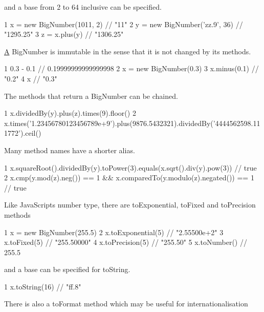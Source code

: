 and a base from 2 to 64 inclusive can be specified.


\begin{DoxyCode}
1 x = new BigNumber(1011, 2)          // "11"
2 y = new BigNumber('zz.9', 36)       // "1295.25"
3 z = x.plus(y)                       // "1306.25"
\end{DoxyCode}


\hyperlink{class_a}{A} Big\+Number is immutable in the sense that it is not changed by its methods.


\begin{DoxyCode}
1 0.3 - 0.1                           // 0.19999999999999998  
2 x = new BigNumber(0.3)
3 x.minus(0.1)                        // "0.2"
4 x                                   // "0.3"
\end{DoxyCode}


The methods that return a Big\+Number can be chained.


\begin{DoxyCode}
1 x.dividedBy(y).plus(z).times(9).floor()
2 x.times('1.23456780123456789e+9').plus(9876.5432321).dividedBy('4444562598.111772').ceil()
\end{DoxyCode}


Many method names have a shorter alias.


\begin{DoxyCode}
1 x.squareRoot().dividedBy(y).toPower(3).equals(x.sqrt().div(y).pow(3))         // true
2 x.cmp(y.mod(z).neg()) == 1 && x.comparedTo(y.modulo(z).negated()) == 1        // true
\end{DoxyCode}


Like Java\+Script\textquotesingle{}s number type, there are {\ttfamily to\+Exponential}, {\ttfamily to\+Fixed} and {\ttfamily to\+Precision} methods


\begin{DoxyCode}
1 x = new BigNumber(255.5)
2 x.toExponential(5)                  // "2.55500e+2"
3 x.toFixed(5)                        // "255.50000"
4 x.toPrecision(5)                    // "255.50"
5 x.toNumber()                        // 255.5
\end{DoxyCode}


and a base can be specified for {\ttfamily to\+String}.


\begin{DoxyCode}
1 x.toString(16)                     // "ff.8"
\end{DoxyCode}


There is also a {\ttfamily to\+Format} method which may be useful for internationalisation


